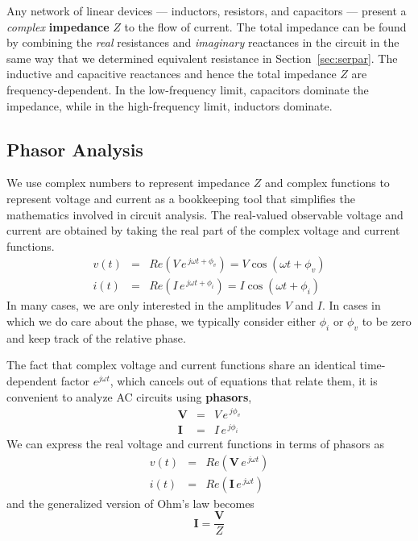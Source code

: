 \documentclass[11pt]{article}
\begin{document}
Any network of linear devices ---  inductors, resistors, and
capacitors --- present a \emph{complex} \textbf{impedance} $Z$ to the
flow of current. The total impedance can be found by combining the
\emph{real} resistances and \emph{imaginary} reactances in the circuit
in the same way that we determined equivalent resistance in
Section~\ref{sec:serpar}. The inductive and capacitive reactances and
hence the total impedance $Z$ are frequency-dependent. In the
low-frequency limit, capacitors dominate the impedance, while in the
high-frequency limit, inductors dominate.

\subsection{Phasor Analysis}

We use complex numbers to represent impedance $Z$ and complex
functions to represent voltage and current as a bookkeeping
tool that simplifies the mathematics involved in circuit
analysis. The real-valued observable voltage and current are obtained
by  taking the real part of the complex voltage and current functions.
\begin{eqnarray}
  v(t) &=& Re(V \, e^{\,j\omega t + \phi_v}) = V \cos(\omega t + \phi_v)\\
  \nonumber
  i(t) &=& Re(I \, e^{\,j\omega t + \phi_i}) = I \cos(\omega t + \phi_i)
\end{eqnarray}
In many cases, we are only interested in the amplitudes $V$ and
$I$. In cases in which we do care about the phase, we typically
consider either $\phi_i$ or $\phi_v$ to be zero and keep track of the
relative phase.

The fact that complex voltage and current functions share an identical
time-dependent factor $e^{j \omega t}$, which cancels out of
equations that relate them, it is convenient to analyze AC circuits
using \textbf{phasors},
\begin{eqnarray}
  \mathbf{V} &=& V \, e^{\,j \phi_v}\\
  \nonumber
  \mathbf{I} &=& I \, e^{\,j \phi_i}
\end{eqnarray}
We can express the real voltage and current functions in terms of
phasors as
\begin{eqnarray}
  v(t) &=& Re(\mathbf{V} \, e^{\,j\omega t})\\
  \nonumber
  i(t) &=& Re(\mathbf{I} \, e^{\,j\omega t})
\end{eqnarray}
and the generalized version of Ohm's law becomes
\begin{equation}
  \mathbf{I} = \frac{\mathbf{V}}{Z}
  \label{eq:genohmphasor}
\end{equation}
\end{document}
